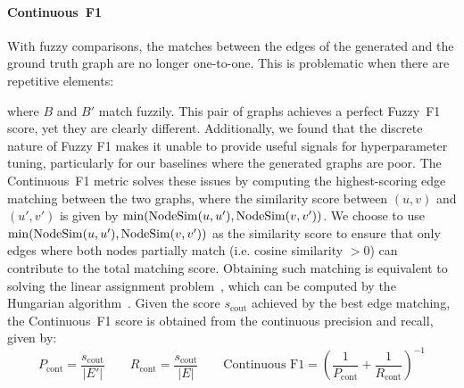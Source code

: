\paragraph{Continuous~F1}
With fuzzy comparisons, the matches between the edges of the generated and the ground truth graph are no longer one-to-one. This is problematic when there are repetitive elements:
\begin{figure}[H]
    \centering
\end{figure}
\vspace{-1em}
where $B$ and $B'$ match fuzzily. This pair of graphs achieves a perfect Fuzzy~F1 score, yet they are clearly different. Additionally, we found that the discrete nature of Fuzzy F1 makes it unable to provide useful signals for hyperparameter tuning, particularly for our baselines where the generated graphs are poor. The Continuous~F1 metric solves these issues by computing the highest-scoring edge matching between the two graphs, where the similarity score between $(u, v)$ and $(u', v')$ is given by $\min(\operatorname{NodeSim}(u, u'), \operatorname{NodeSim}(v, v'))$. We choose to use $\min(\operatorname{NodeSim}(u, u'), \operatorname{NodeSim}(v, v'))$ as the similarity score to ensure that only edges where both nodes partially match (i.e. cosine similarity $> 0$) can contribute to the total matching score. Obtaining such matching is equivalent to solving the linear assignment problem~\cite{martello1987linear}, which can be computed by the Hungarian algorithm~\cite{kuhn1955hungarian}. Given the score $s_{\text{cout}}$ achieved by the best edge matching, the Continuous~F1 score is obtained from the continuous precision and recall, given by:
\[
    P_{\text{cont}} = \frac{s_{\text{cout}}}{|E'|} \qquad
    R_{\text{cont}} = \frac{s_{\text{cout}}}{|E|} \qquad
    \text{Continuous~F1} = \left(\frac{1}{P_{\text{cont}}} + \frac{1}{R_{\text{cont}}}\right)^{-1}
\]

